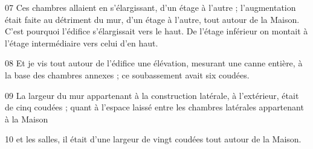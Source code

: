 
07 Ces chambres allaient en s’élargissant, d’un étage à l’autre ; l’augmentation était faite au détriment du mur, d’un étage à l’autre, tout autour de la Maison. C’est pourquoi l’édifice s’élargissait vers le haut. De l’étage inférieur on montait à l’étage intermédiaire vers celui d’en haut.

08 Et je vis tout autour de l’édifice une élévation, mesurant une canne entière, à la base des chambres annexes ; ce soubassement avait six coudées.

09 La largeur du mur appartenant à la construction latérale, à l’extérieur, était de cinq coudées ; quant à l’espace laissé entre les chambres latérales appartenant à la Maison

10 et les salles, il était d’une largeur de vingt coudées tout autour de la Maison.

